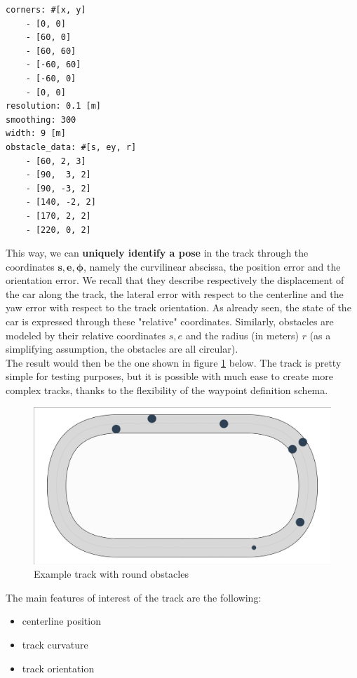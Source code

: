 \documentclass[a4paper, onecolumn, 12pt]{article}
\begin{document}
\begin{Verbatim}[frame=single,label=Example of a track configuration file,labelposition=topline,framesep=10pt]
corners: #[x, y]
    - [0, 0]
    - [60, 0]
    - [60, 60]
    - [-60, 60]
    - [-60, 0]
    - [0, 0]
resolution: 0.1 [m]
smoothing: 300 
width: 9 [m]
obstacle_data: #[s, ey, r]
    - [60, 2, 3]
    - [90,  3, 2]
    - [90, -3, 2]
    - [140, -2, 2]
    - [170, 2, 2]
    - [220, 0, 2]
\end{Verbatim}
This way, we can \textbf{uniquely identify a pose} in the track through the
coordinates $\mathbf{s,e,\phi}$, namely the curvilinear abscissa, the position
error and the orientation error. We recall that they describe respectively the
displacement of the car along the track, the lateral error with respect to the
centerline and the yaw error with respect to the track orientation. As already
seen, the state of the car is expressed through these "relative" coordinates.
Similarly, obstacles are modeled by their relative coordinates $s,e$ and the
radius (in meters) $r$ (as a simplifying assumption, the obstacles are all
circular). \\
The result would then be the one shown in figure \ref{ippodromo} below. The
track is pretty simple for testing purposes, but it is possible with much ease
to create more complex tracks, thanks to the flexibility of the waypoint
definition schema. 
\begin{figure}[H]
    \centering
    \includegraphics[width=\textwidth]{assets/ippodromo_obstacles.png}
    \caption{Example track with round obstacles}
    \label{ippodromo}
\end{figure} \vspace{0.5cm}
The main features of interest of the track are the following:
\begin{itemize}
    \item centerline position
    \item track curvature
    \item track orientation
\end{itemize}
\end{document}
